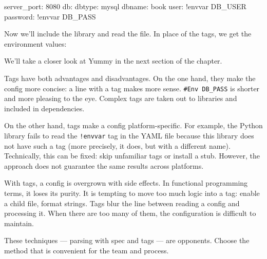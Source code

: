 \begin{yaml}
server_port: 8080
db:
  dbtype:   mysql
  dbname:   book
  user:     !envvar DB_USER
  password: !envvar DB_PASS
\end{yaml}

Now we'll include the library and read the file. In place of the tags, we get the environment values:

\ifx\DEVICETYPE\MOBILE

\begin{clojure}
(require '[yummy.config :as yummy])
(yummy/load-config
  {:path "config.yaml"})

{:server_port 8080
 :db {:dbtype "mysql"
      :dbname "book"
      :user "ivan"
      :password "*(&fd}A53z#$!"}}
\end{clojure}

\else

\begin{clojure}
(require '[yummy.config :as yummy])
(yummy/load-config {:path "config.yaml"})

{:server_port 8080
 :db {:dbtype "mysql"
      :dbname "book"
      :user "ivan"
      :password "*(&fd}A53z#$!"}}
\end{clojure}

\fi

\noindent
We'll take a closer look at Yummy in the next section of the chapter.

Tags have both advantages and disadvantages. On the one hand, they make the config more concise: a line with a tag makes more sense. \verb|#Env DB_PASS| is shorter and more pleasing to the eye. Complex tags are taken out to libraries and included in dependencies.

On the other hand, tags make a config platform-specific. For example, the Python library fails to read the \verb|!envvar| tag in the YAML file because this library does not have such a tag (more precisely, it does, but with a different name). Technically, this can be fixed: skip unfamiliar tags or install a stub. However, the approach does not guarantee the same results across platforms.

With tags, a config is overgrown with side effects. In functional programming terms, it loses its purity. It is tempting to move too much logic into a tag: enable a child file, format strings. Tags blur the line between reading a config and processing it. When there are too many of them, the configuration is difficult to maintain.

These techniques — parsing with spec and tags — are opponents. Choose the method that is convenient for the team and process.

